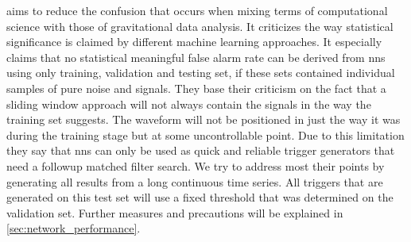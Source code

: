 \cite{cnn_magiacal_bullet} aims to reduce the confusion that occurs when mixing terms of computational science with those of gravitational data analysis. It criticizes the way statistical significance is claimed by different machine learning approaches. It especially claims that no statistical meaningful false alarm rate can be derived from \gls{nns} using only training, validation and testing set, if these sets contained individual samples of pure noise and signals. They base their criticism on the fact that a sliding window approach will not always contain the signals in the way the training set suggests. The waveform will not be positioned in just the way it was during the training stage but at some uncontrollable point. Due to this limitation they say that \gls{nns} can only be used as quick and reliable trigger generators that need a followup matched filter search. We try to address most their points by generating all results from a long continuous time series. All triggers that are generated on this test set will use a fixed threshold that was determined on the validation set. Further measures and precautions will be explained in \autoref{sec:network_performance}.